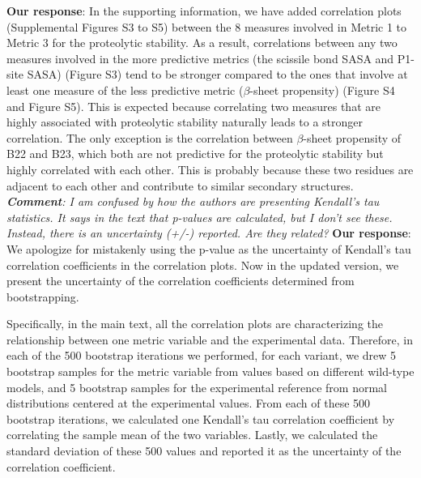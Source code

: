 \documentclass[9pt]{elife}
\begin{document}
\newline
\indent 
{\bf Our response}: 
In the supporting information, we have added correlation plots (Supplemental Figures S3 to S5) between the 8 measures involved in Metric 1 to Metric 3 for the proteolytic stability. As a result, correlations between any two measures involved in the more predictive metrics (the scissile bond SASA and P1-site SASA) (Figure S3) tend to be stronger compared to the ones that involve at least one measure of the less predictive metric ($\beta$-sheet propensity) (Figure S4 and Figure S5). This is expected because correlating two measures that are highly associated with proteolytic stability naturally leads to a stronger correlation. The only exception is the correlation between $\beta$-sheet propensity of B22 and B23, which both are not predictive for the proteolytic stability but highly correlated with each other. This is probably because these two residues are adjacent to each other and contribute to similar secondary structures. 
\newline
\newline
\indent
\textit{\textbf{Comment}:
I am confused by how the authors are presenting Kendall's tau statistics. It says in the text that p-values are calculated, but I don't see these.  Instead, there is an uncertainty (+/-) reported.  Are they related?}
\newline
\indent 
{\bf Our response}: 
We apologize for mistakenly using the p-value as the uncertainty of Kendall's tau correlation coefficients in the correlation plots. Now in the updated version, we present the uncertainty of the correlation coefficients determined from bootstrapping. 

Specifically, in the main text, all the correlation plots are characterizing the relationship between one metric variable and the experimental data. Therefore, in each of the 500 bootstrap iterations we performed, for each variant, we drew 5 bootstrap samples for the metric variable from values based on different wild-type models, and 5 bootstrap samples for the experimental reference from normal distributions centered at the experimental values. From each of these 500 bootstrap iterations, we calculated one Kendall's tau correlation coefficient by correlating the sample mean of the two variables. Lastly, we calculated the standard deviation of these 500 values and reported it as the uncertainty of the correlation coefficient. 
\end{document}
